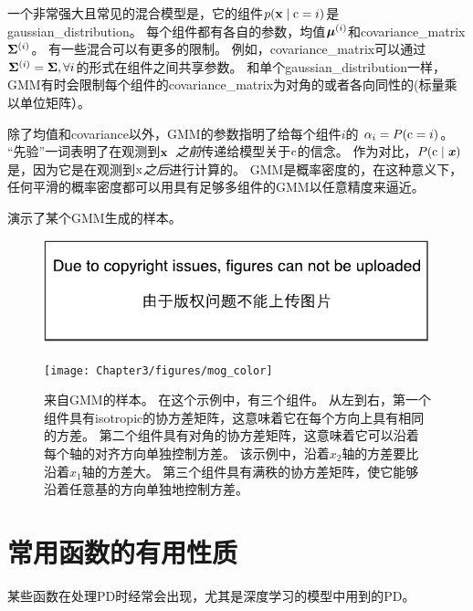 一个非常强大且常见的混合模型是，它的组件$p(\mathbf{x} \mid \mathrm{c}= i)$是\gls{gaussian_distribution}。
每个组件都有各自的参数，均值$\boldsymbol{\mu}^{(i)}$和\gls{covariance_matrix} $\boldsymbol{\Sigma}^{(i)}$。
有一些混合可以有更多的限制。
例如，\gls{covariance_matrix}可以通过$\boldsymbol{\Sigma}^{(i)} = \boldsymbol{\Sigma}, \forall i$的形式在组件之间共享参数。
和单个\gls{gaussian_distribution}一样，\gls{GMM}有时会限制每个组件的\gls{covariance_matrix}为对角的或者各向同性的(标量乘以单位矩阵）。

除了均值和\gls{covariance}以外，\gls{GMM}的参数指明了给每个组件$i$的 $\alpha_i = P(\mathrm{c} = i)$。
``先验''一词表明了在观测到$\mathbf{x}$~\emph{之前}传递给模型关于$\mathrm{c}$的信念。
作为对比，$P(\mathrm{c} \mid \boldsymbol{\mathit{x}})$是，因为它是在观测到$\mathrm{x}$\emph{之后}进行计算的。
\gls{GMM}是概率密度的，在这种意义下，任何平滑的概率密度都可以用具有足够多组件的\gls{GMM}以任意精度来逼近。

演示了某个\gls{GMM}生成的样本。
\begin{figure}[!htb]
\ifOpenSource
\centerline{\includegraphics{figure.pdf}}
\else
\centerline{\texttt{[image: Chapter3/figures/mog\_color]}}
\fi
\caption{来自\gls{GMM}的样本。
在这个示例中，有三个组件。
从左到右，第一个组件具有\gls{isotropic}的协方差矩阵，这意味着它在每个方向上具有相同的方差。 第二个组件具有对角的协方差矩阵，这意味着它可以沿着每个轴的对齐方向单独控制方差。
该示例中，沿着$x_2$轴的方差要比沿着$x_1$轴的方差大。 第三个组件具有满秩的协方差矩阵，使它能够沿着任意基的方向单独地控制方差。}
\label{fig:chap3_mog_color}
\end{figure}


\section{常用函数的有用性质}
\label{sec:useful_properties_of_common_functions}

某些函数在处理\gls{PD}时经常会出现，尤其是深度学习的模型中用到的\gls{PD}。


